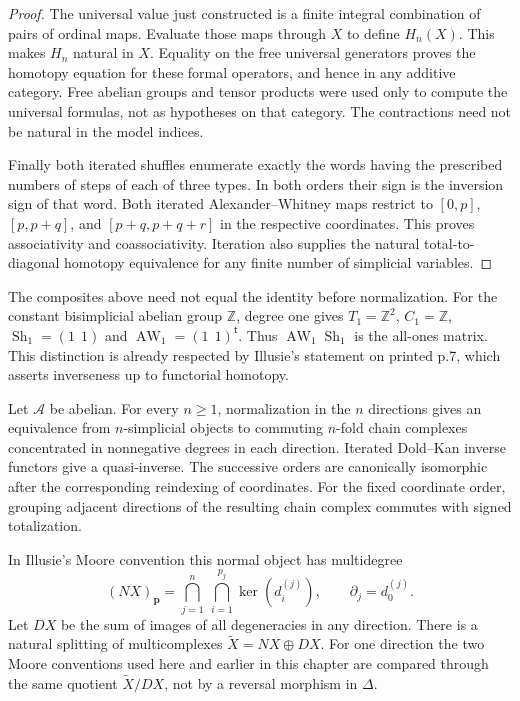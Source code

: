 \begin{proof}
The universal value just constructed is a finite integral combination of
pairs of ordinal maps. Evaluate those maps through $X$ to define $H_n(X)$.
This makes $H_n$ natural in $X$. Equality on the free universal generators
proves the homotopy equation for these formal operators, and hence in any
additive category. Free abelian groups and tensor products were used only
to compute the universal formulas, not as hypotheses on that category.
The contractions need not be natural in the model indices.

Finally both iterated shuffles enumerate exactly the words having the
prescribed numbers of steps of each of three types. In both orders their
sign is the inversion sign of that word. Both iterated Alexander--Whitney
maps restrict to $[0,p]$, $[p,p+q]$, and $[p+q,p+q+r]$ in the respective
coordinates. This proves associativity and coassociativity. Iteration
also supplies the natural total-to-diagonal homotopy equivalence for any
finite number of simplicial variables.
\end{proof}

\begin{remark}
\label{remark-illusie-I-unnormalized-composites}
The composites above need not equal the identity before normalization.
For the constant bisimplicial abelian group $\mathbb Z$, degree one gives
$T_1=\mathbb Z^2$, $C_1=\mathbb Z$,
$\operatorname{Sh}_1=(1\ \ 1)$ and
$\operatorname{AW}_1=(1\ \ 1)^{\mathsf t}$.
Thus $\operatorname{AW}_1\operatorname{Sh}_1$ is the all-ones matrix.
This distinction is already respected by Illusie's statement on printed
p.7, which asserts inverseness up to functorial homotopy.
\end{remark}

\begin{theorem}
\label{theorem-illusie-I-iterated-dold-kan}
Let $\mathcal A$ be abelian. For every $n\geq1$, normalization in the
$n$ directions gives an equivalence from $n$-simplicial objects to
commuting $n$-fold chain complexes concentrated in nonnegative degrees in
each direction. Iterated Dold--Kan inverse functors give a quasi-inverse.
The successive orders are canonically isomorphic after the corresponding
reindexing of coordinates. For the fixed coordinate order, grouping adjacent
directions of the resulting chain complex commutes with signed totalization.

In Illusie's Moore convention this normal object has multidegree
\[
 (NX)_{\mathbf p}
 =\bigcap_{j=1}^n\ \bigcap_{i=1}^{p_j}\ker(d_i^{(j)}),
 \qquad \partial_j=d_0^{(j)}.
\]
Let $DX$ be the sum of images of all degeneracies in any direction.
There is a natural splitting of multicomplexes
$\widetilde X=NX\oplus DX$. For one direction the two Moore conventions
used here and earlier in this chapter are compared through the same
quotient $\widetilde X/DX$, not by a reversal morphism in $\Delta$.
\end{theorem}

